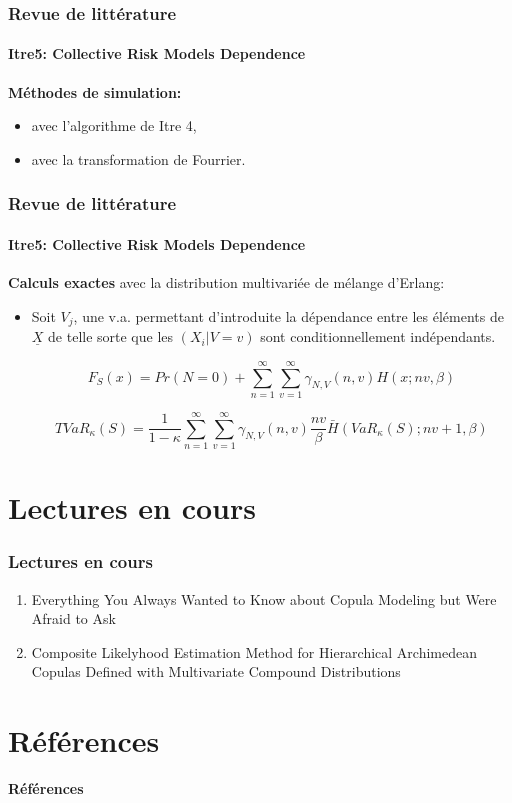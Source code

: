 \documentclass[11pt]{beamer}
\begin{document}
\begin{frame}
	\frametitle{Revue de littérature}
	\framesubtitle{Itre5: Collective Risk Models Dependence \cite{Itre5}}
	
	\textbf{Méthodes de simulation:}
	\begin{itemize}
		\item avec l'algorithme de Itre 4,
		\item avec la transformation de Fourrier.
	\end{itemize}
	
\end{frame}


\begin{frame}
	\frametitle{Revue de littérature}
	\framesubtitle{Itre5: Collective Risk Models Dependence \cite{Itre5}}
	
	\textbf{Calculs exactes} avec la distribution multivariée de mélange d'Erlang:\\
	
	\begin{itemize}
		\item Soit $V_j$, une v.a. permettant d'introduite la dépendance entre les éléments de $\underline{X}$ de telle sorte que les $(X_i|V=v)$ sont conditionnellement indépendants.
		
		\begin{equation*}
		F_S(x) = Pr(N=0) + \sum_{n=1}^{\infty} \sum_{v=1}^{\infty} \gamma_{N,V}(n,v) H(x; nv, \beta)
		\end{equation*}
		
		\begin{equation*}
		TVaR_{\kappa}(S) = \frac{1}{1-\kappa} \sum_{n=1}^{\infty} \sum_{v=1}^{\infty} \gamma_{N,V}(n,v) \frac{nv}{\beta} \bar{H}(VaR_{\kappa}(S); nv + 1, \beta)
		\end{equation*}
		
	\end{itemize}
\end{frame}


\section{Lectures en cours}
\begin{frame}
	\frametitle{Lectures en cours}
	
	\begin{enumerate}
		\item Everything You Always Wanted to Know about Copula Modeling but Were Afraid to Ask \cite{Everything}
		\newline
		\item Composite Likelyhood Estimation Method for Hierarchical Archimedean Copulas Defined with Multivariate Compound Distributions \cite{LikelyhoodEstimation}
	\end{enumerate}
\end{frame}


\section{Références}
\begin{frame}[allowframebreaks]{\textbf{Références}}
	
	
\end{frame}
\end{document}
